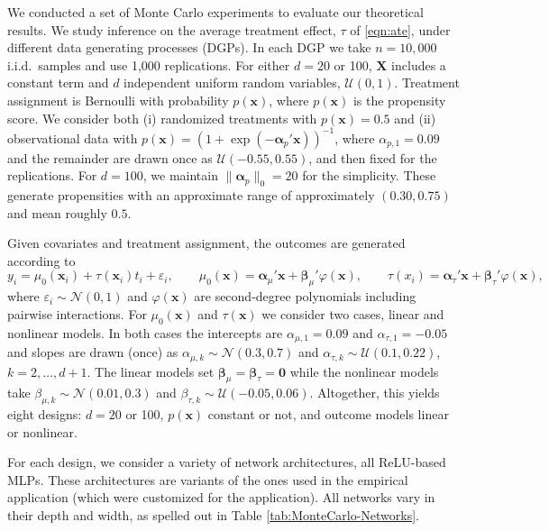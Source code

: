 \documentclass[11pt]{article}
\numberwithin{equation}{section}
\theoremstyle{definition}
\newcommand{\bx}{\bm{x}}
\newcommand{\bX}{\bm{X}}
\begin{document}
We conducted a set of Monte Carlo experiments to evaluate our theoretical results. We study inference on the average treatment effect, $\tau$ of \eqref{eqn:ate}, under different data generating processes (DGPs). In each DGP we take $n=10,000$ i.i.d.\ samples and use 1,000 replications. For either $d=20$ or 100, $\bX$ includes a constant term and $d$ independent uniform random variables, $\mathcal{U}(0,1)$. Treatment assignment is Bernoulli with probability $p(\bx)$, where $p(\bx)$ is the propensity score. We consider both (i) randomized treatments with $p(\bx) = 0.5$ and (ii) observational data with $p(\bx)= ( 1+\exp(-\bm{\alpha}_p'\bx) )^{-1}$, where $\alpha_{p,1} = 0.09$ and the remainder are drawn once as $\mathcal{U}(-0.55,0.55)$, and then fixed for the replications. For $d=100$, we maintain $\|\bm{\alpha}_p\|_0 = 20$ for the simplicity. These generate propensities with an approximate range of approximately $(0.30,0.75)$ and mean roughly $0.5$.

Given covariates and treatment assignment, the outcomes are generated according to
\[
	y_i = \mu_0(\bx_i) + \tau(\bx_i) t_i + \varepsilon_i  ,    \qquad         \mu_0(\bx) = \bm{\alpha}_\mu'\bx + \bm{\beta}_{\mu}'\varphi(\bx)  ,    \qquad         \tau\left(x_{i}\right)  = \bm{\alpha}_\tau'\bx + \bm{\beta}_{\tau}'\varphi(\bx),
\]
where $\varepsilon_i \sim \mathcal{N}(0,1)$ and $\varphi(\bx)$ are second-degree polynomials including pairwise interactions. For $\mu_0(\bx)$ and $\tau(\bx)$ we consider two cases, linear and nonlinear models. In both cases the intercepts are $\alpha_{\mu,1} = 0.09$ and $\alpha_{\tau,1} = -0.05$ and slopes are drawn (once) as $\alpha_{\mu,k} \sim \mathcal{N}(0.3,0.7)$ and $\alpha_{\tau,k} \sim \mathcal{U}(0.1,0.22)$, $k = 2, \ldots, d+1$. The linear models set $\bm{\beta}_{\mu} = \bm{\beta}_{\tau} = \bm{0}$ while the nonlinear models take $\beta_{\mu,k} \sim \mathcal{N}(0.01,0.3)$ and $\beta_{\tau,k} \sim \mathcal{U}(-0.05,0.06)$. Altogether, this yields eight designs: $d=20$ or 100, $p(\bx)$ constant or not, and outcome models linear or nonlinear.


For each design, we consider a variety of network architectures, all ReLU-based MLPs. These architectures are variants of the ones used in the empirical application (which were customized for the application). All networks vary in their depth and width, as spelled out in Table \ref{tab:MonteCarlo-Networks}.
\end{document}
